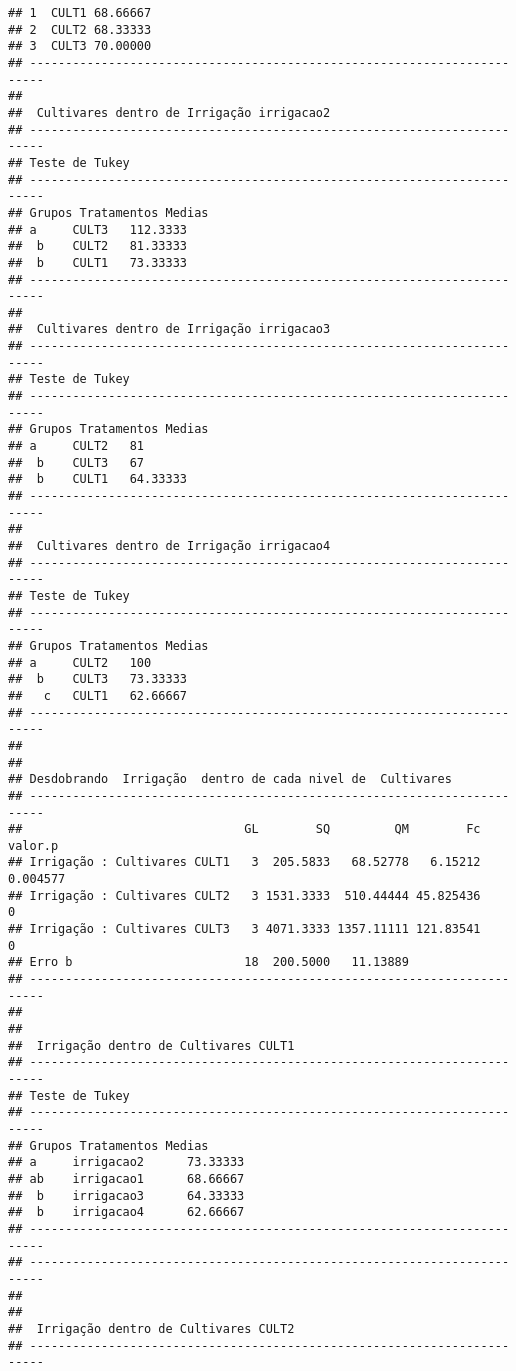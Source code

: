 \documentclass[
]{article}
\begin{document}
\begin{verbatim}
## 1  CULT1 68.66667
## 2  CULT2 68.33333
## 3  CULT3 70.00000
## ------------------------------------------------------------------------
## 
##  Cultivares dentro de Irrigação irrigacao2
## ------------------------------------------------------------------------
## Teste de Tukey
## ------------------------------------------------------------------------
## Grupos Tratamentos Medias
## a     CULT3   112.3333 
##  b    CULT2   81.33333 
##  b    CULT1   73.33333 
## ------------------------------------------------------------------------
## 
##  Cultivares dentro de Irrigação irrigacao3
## ------------------------------------------------------------------------
## Teste de Tukey
## ------------------------------------------------------------------------
## Grupos Tratamentos Medias
## a     CULT2   81 
##  b    CULT3   67 
##  b    CULT1   64.33333 
## ------------------------------------------------------------------------
## 
##  Cultivares dentro de Irrigação irrigacao4
## ------------------------------------------------------------------------
## Teste de Tukey
## ------------------------------------------------------------------------
## Grupos Tratamentos Medias
## a     CULT2   100 
##  b    CULT3   73.33333 
##   c   CULT1   62.66667 
## ------------------------------------------------------------------------
## 
## 
## Desdobrando  Irrigação  dentro de cada nivel de  Cultivares 
## ------------------------------------------------------------------------
##                               GL        SQ         QM        Fc  valor.p
## Irrigação : Cultivares CULT1   3  205.5833   68.52778   6.15212 0.004577
## Irrigação : Cultivares CULT2   3 1531.3333  510.44444 45.825436        0
## Irrigação : Cultivares CULT3   3 4071.3333 1357.11111 121.83541        0
## Erro b                        18  200.5000   11.13889                   
## ------------------------------------------------------------------------
## 
## 
##  Irrigação dentro de Cultivares CULT1
## ------------------------------------------------------------------------
## Teste de Tukey
## ------------------------------------------------------------------------
## Grupos Tratamentos Medias
## a     irrigacao2      73.33333 
## ab    irrigacao1      68.66667 
##  b    irrigacao3      64.33333 
##  b    irrigacao4      62.66667 
## ------------------------------------------------------------------------
## ------------------------------------------------------------------------
## 
## 
##  Irrigação dentro de Cultivares CULT2
## ------------------------------------------------------------------------

\end{verbatim}
\end{document}
